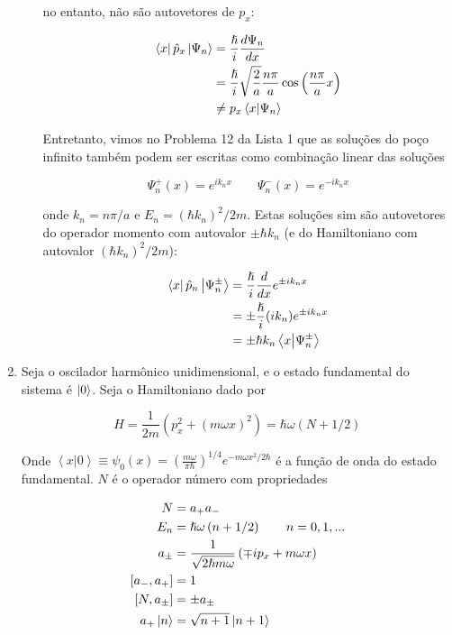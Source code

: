 \documentclass[a4paper, 12pt, notitlepage]{article}
\begin{document}
\begin{enumerate}
\begin{enumerate}[(A)]
  \noindent no entanto, não são autovetores de $p_x$:
  
  \begin{align*}
    \bra{x}\hat{p}_x \ket{\Psi_n} &= \frac{\hslash}{i} \frac{d\Psi_n}{dx} \\
    &= \frac{\hslash}{i} \sqrt{\frac{2}{a}} \frac{n\pi}{a} \cos\left(\frac{n\pi}{a}x\right) \\
    &\neq p_x \bra{x}\ket{\Psi_n}
  \end{align*}
  
  Entretanto, vimos no Problema 12 da Lista 1 que as soluções do poço infinito também podem ser escritas como combinação linear das soluções
  
  \[
    \Psi_n^+(x) = e^{ik_nx} \qquad \Psi_n^-(x) = e^{-ik_nx}
  \]
  
  \noindent onde $k_n = n\pi/a$ e $E_n = (\hbar k_n)^2/2m$. Estas soluções sim são autovetores do operador momento com autovalor $\pm \hbar k_n$ (e do Hamiltoniano com autovalor $(\hbar k_n)^2/2m$):
  
  \begin{align*}
    \bra{x}\hat{p}_n \ket{\Psi_n^{\pm}} &= \frac{\hslash}{i} \frac{d}{dx} e^{\pm ik_nx} \\
    &= \pm \frac{\hslash}{i} (ik_n) e^{\pm ik_nx} \\
    &= \pm \hslash k_n \bra{x}\ket{\Psi_n^{\pm}}
  \end{align*}
  
\end{enumerate}


\item Seja o oscilador harmônico unidimensional, e o estado fundamental do sistema é $\ket{0}$. Seja o Hamiltoniano dado por

\[ H = \frac{1}{2m} \left(p_x^2 + (m\omega x)^2 \right) = \hbar \omega(N + 1/2) \]

Onde $\left\langle x | 0 \right\rangle \equiv \psi_0(x) = \left(\frac{m\omega}{\pi \hbar}\right)^{1/4} e^{-m\omega x^2/2\hbar}$ é a função de onda do estado fundamental. $N$ é o operador número com propriedades

\begin{align*}
  N &= a_+ a_- \\
  E_n &= \hslash \omega \left(n + 1/2\right)\qquad n = 0, 1, ... \\
  a_{\pm} &= \frac{1}{\sqrt{2\hslash m\omega}}\left(\mp ip_x + m\omega x\right) \\
  [a_-, a_+] &= 1 \\
  [N, a_{\pm}] &= \pm a_{\pm} \\
  a_+ \ket{n} &= \sqrt{n + 1}\ket{n+1}
\end{align*}


\end{enumerate}
\end{document}

